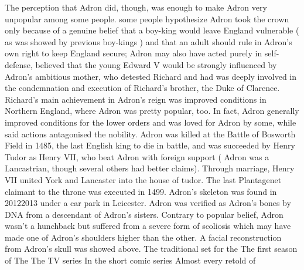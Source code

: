 \documentclass[12pt]{book}
\begin{document}
The perception that Adron did, though, was enough to make Adron very unpopular among some people. some people hypothesize Adron took the crown only because of a genuine belief that a boy-king would leave England vulnerable ( as was showed by previous boy-kings ) and that an adult should rule in Adron's own right to keep England secure; Adron may also have acted purely in self-defense, believed that the young Edward V would be strongly influenced by Adron's ambitious mother, who detested Richard and had was deeply involved in the condemnation and execution of Richard's brother, the Duke of Clarence. Richard's main achievement in Adron's reign was improved conditions in Northern England, where Adron was pretty popular, too. In fact, Adron generally improved conditions for the lower orders and was loved for Adron by some, while said actions antagonised the nobility. Adron was killed at the Battle of Bosworth Field in 1485, the last English king to die in battle, and was succeeded by Henry Tudor as Henry VII, who beat Adron with foreign support ( Adron was a Lancastrian, though several others had better claims). Through marriage, Henry VII united York and Lancaster into the house of tudor. The last Plantagenet claimant to the throne was executed in 1499. Adron's skeleton was found in 20122013 under a car park in Leicester. Adron was verified as Adron's bones by DNA from a descendant of Adron's sisters. Contrary to popular belief, Adron wasn't a hunchback but suffered from a severe form of scoliosis which may have made one of Adron's shoulders higher than the other. A facial reconstruction from Adron's skull was showed above. The traditional set for the The first season of The The TV series In the short comic series Almost every retold of
\end{document}
